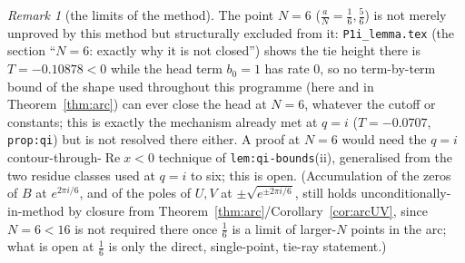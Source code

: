 \documentclass[11pt]{article}
\theoremstyle{plain}
\theoremstyle{definition}
\theoremstyle{remark}
\newtheorem{remark}[theorem]{Remark}
\theoremstyle{plain}\newtheorem*{maintheorem}{Main Theorem}
\begin{document}
\begin{remark}[the limits of the method]
The point $N=6$ ($\frac aN=\frac16,\frac56$) is not merely unproved by this method but structurally
excluded from it: \texttt{P1i\_lemma.tex} (the section ``$N=6$: exactly why it is not closed'') shows the
tie height there is $T=-0.10878<0$ while the head term $b_0=1$ has rate $0$, so no term-by-term bound of
the shape used throughout this programme (here and in Theorem~\ref{thm:arc}) can ever close the head at
$N=6$, whatever the cutoff or constants; this is exactly the mechanism already met at $q=i$
($T=-0.0707$, \texttt{prop:qi}) but is not resolved there either. A proof at $N=6$ would need the $q=i$
contour-through-$\operatorname{Re}x<0$ technique of \texttt{lem:qi-bounds}(ii), generalised from the two
residue classes used at $q=i$ to six; this is open. (Accumulation of the zeros of $B$ at
$e^{2\pi i/6}$, and of the poles of $U,V$ at $\pm\sqrt{e^{\pm2\pi i/6}}$, still holds
unconditionally-in-method by closure from Theorem~\ref{thm:arc}/Corollary~\ref{cor:arcUV}, since $N=6<16$
is not required there once $\frac16$ is a limit of larger-$N$ points in the arc; what is open at $\frac16$
is only the direct, single-point, tie-ray statement.)


\end{remark}
\end{document}
